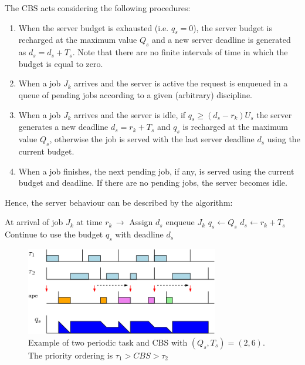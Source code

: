 The CBS acts considering the following procedures:
\begin{enumerate}
    \item When the server budget is exhausted (i.e. $q_s = 0$), the server budget is recharged at the maximum value $Q_s$ and a new server deadline is generated as $d_s = d_s + T_s$. Note that there are no finite intervals of time in which the budget is equal to zero.
    \item When a job $J_k$ arrives and the server is active the request is enqueued in a queue of pending jobs according to a given (arbitrary) discipline.
    \item When a job $J_k$ arrives and the server is idle, if $q_s \ge (d_s - r_k) U_s$ the server generates a new deadline $d_s = r_k + T_s$ and $q_s$ is recharged at the maximum value $Q_s$, otherwise the job is served with the last server deadline $d_s$ using the current budget.
    \item When a job finishes, the next pending job, if any, is served using the current budget and deadline. If there are no pending jobs, the server becomes idle.
\end{enumerate}

Hence, the server behaviour can be described by the algorithm:
\begin{algorithm}
    \begin{algorithmic}
        \STATE At arrival of job $J_k$ at time $r_k\,\rightarrow$ Assign $d_s$ 
        \STATE enqueue $J_k$
        \ELSE
        \STATE $q_s \leftarrow Q_s$       %
        \STATE $d_s \leftarrow r_k + T_s$ %
        \ELSE
        \STATE Continue to use the budget $q_s$ with deadline $d_s$
        \ENDIF
        \ENDIF
    \end{algorithmic}
\end{algorithm}

\begin{figure}[!h]
    \centering
    \includegraphics[width= 0.75\textwidth]{images/image10.png}
    \caption{Example of two periodic task and CBS with $(Q_s, T_s) = (2,6)$. The priority ordering is $\tau_1 > CBS > \tau_2$}
\end{figure}


